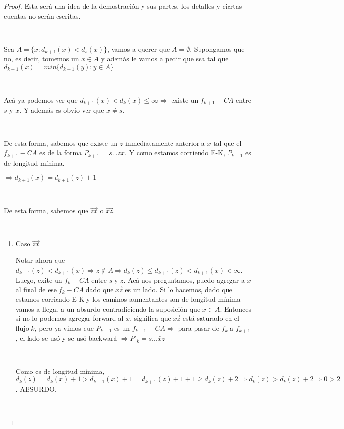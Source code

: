 \documentclass[11pt]{article}
\begin{document}
\begin{proof}
Esta será una idea de la demostración y sus partes, los detalles y ciertas cuentas no serán escritas.\par
\

Sea $A = \{x : d_{k+1}(x) < d_k(x)\}$, vamos a querer que $A = \emptyset$. Supongamos que no, es decir, tomemos un $x \in  A$ y además le vamos a pedir que sea tal que $d_{k+1}(x) = min\{d_{k+1}(y) : y\in A \}$\par
\

Acá ya podemos ver que $d_{k+1}(x) < d_k(x) \le \infty \Rightarrow$ existe un $f_{k+1}-CA$ entre $s$ y $x$. Y además es obvio ver que $x \ne s$.\par
\

De esta forma, sabemos que existe un $z$ inmediatamente anterior a $x$ tal que el $f_{k+1}-CA$ es de la forma $P_{k+1} = s...zx$. Y como estamos corriendo E-K, $P_{k+1}$ es de longitud mínima.\par
\begin{center}
$\Rightarrow d_{k+1}(x) = d_{k+1}(z) + 1$
\end{center} \par 
\

De esta forma, sabemos que $\overrightarrow{zx}$ o $ \overrightarrow{xz}$.\par
\

\begin{enumerate}
\item Caso  $\overrightarrow{zx}$\par
Notar ahora que $d_{k+1}(z) < d_{k+1}(x) \Rightarrow z \notin A \Rightarrow d_k(z) \le d_{k+1}(z) < d_{k+1}(x) < \infty$. Luego, exite un $f_k -CA$ entre $s$ y $z$. Acá nos preguntamos, puedo agregar a $x$ al final de ese $f_k - CA$ dado que  $\overrightarrow{xz}$ es un lado. Si lo hacemos, dado que estamos corriendo E-K y los caminos aumentantes son de longitud mínima vamos a llegar a un absurdo contradiciendo la suposición que $x \in A$. Entonces si no lo podemos agregar forward al $x$, significa que $ \overrightarrow{xz}$ está saturado en el flujo $k$, pero ya vimos que $P_{k+1}$ es un $f_{k+1}-CA \Rightarrow$ para pasar de $f_k$ a $f_{k+1}$, el lado se usó y se usó backward $\Rightarrow P'_k = s...\overleftarrow{xz} $\par
\

Como es de longitud mínima, $d_k(z) = d_k(x) + 1 > d_{k+1}(x) + 1 = d_{k+1}(z) + 1 + 1 \ge d_k(z) + 2 \Rightarrow d_k(z) > d_k(z) + 2 \Rightarrow 0 > 2$. ABSURDO. \par
\


\end{enumerate}
\end{proof}
\end{document}
